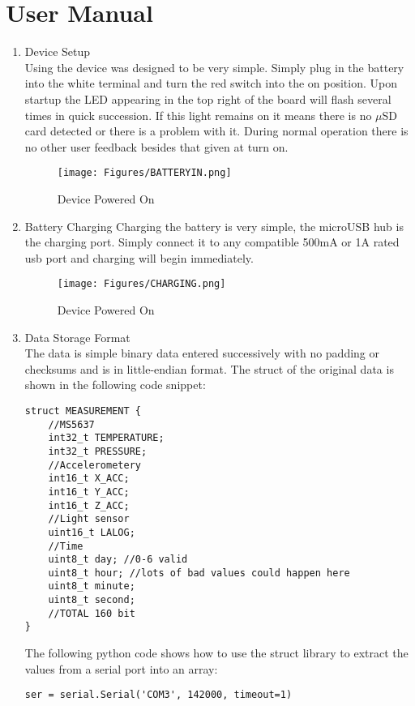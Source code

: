 \documentclass[12pt,openany,a4paper]{book}
\begin{document}
\chapter{User Manual}

\begin{enumerate}
	\item Device Setup\\
	Using the device was designed to be very simple. Simply plug in the battery into the white terminal and turn the red switch into the on position. Upon startup the LED appearing in the top right of the board will flash several times in quick succession. If this light remains on it means there is no $\mu$SD card detected or there is a problem with it. During normal operation there is no other user feedback besides that given at turn on. \\
		
	\begin{figure}[H]
		\centering
		\texttt{[image: Figures/BATTERYIN.png]}
		\caption{Device Powered On}
		\label{fig:BATTERYIN}
	\end{figure}
		
	\item Battery Charging
	Charging the battery is very simple, the microUSB hub is the charging port. Simply connect it to any compatible 500mA or 1A rated usb port and charging will begin immediately. \\
	
	\begin{figure}[H]
		\centering
		\texttt{[image: Figures/CHARGING.png]}
		\caption{Device Powered On}
		\label{fig:CHARGING}
	\end{figure}
	
	\item Data Storage Format \\
		The data is simple binary data entered successively with no padding or checksums and is in little-endian format. The struct of the original data is shown in the following code snippet: \\
		\begin{lstlisting}
struct MEASUREMENT {
	//MS5637
	int32_t TEMPERATURE;
	int32_t PRESSURE;
	//Accelerometery
	int16_t X_ACC;
	int16_t Y_ACC;
	int16_t Z_ACC;
	//Light sensor
	uint16_t LALOG;
	//Time
	uint8_t day; //0-6 valid
	uint8_t hour; //lots of bad values could happen here
	uint8_t minute;
	uint8_t second;
	//TOTAL 160 bit
}
		\end{lstlisting}
		The following python code shows how to use the struct library to extract the values from a serial port into an array: \\
		\begin{lstlisting}
ser = serial.Serial('COM3', 142000, timeout=1)


\end{lstlisting}
\end{enumerate}
\end{document}
